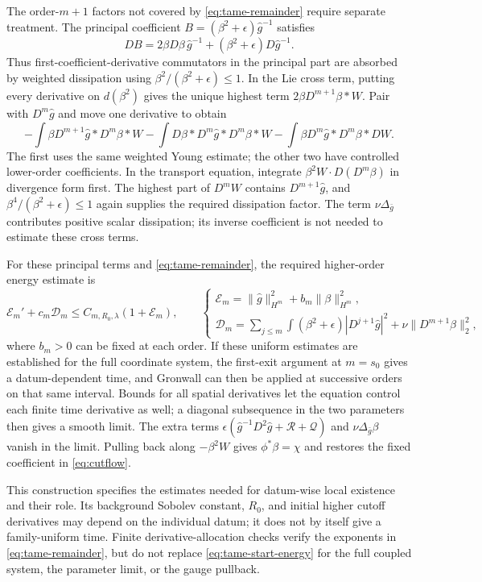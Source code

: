 \documentclass[a4paper,11pt]{article}
\numberwithin{equation}{section}
\theoremstyle{definition}
\begin{document}
The order-$m+1$ factors not covered by \eqref{eq:tame-remainder} require separate treatment.
The principal coefficient $B=(\beta^2+\epsilon)\widehat g^{-1}$ satisfies
\[
DB=2\beta D\beta\,\widehat g^{-1}
+(\beta^2+\epsilon)D\widehat g^{-1}.
\]
Thus first-coefficient-derivative commutators in the principal part are absorbed by weighted dissipation using
$\beta^2/(\beta^2+\epsilon)\le1$.
In the Lie cross term, putting every derivative on $d(\beta^2)$ gives the unique highest term
$2\beta D^{m+1}\beta*W$. Pair with $D^m\widehat g$ and move one derivative to obtain
\[
-\int\beta D^{m+1}\widehat g*D^m\beta*W
-\int D\beta*D^m\widehat g*D^m\beta*W
-\int\beta D^m\widehat g*D^m\beta*DW.
\]
The first uses the same weighted Young estimate; the other two have controlled lower-order coefficients.
In the transport equation, integrate $\beta^2W\cdot D(D^m\beta)$ in divergence form first.
The highest part of $D^mW$ contains $D^{m+1}\widehat g$, and
$\beta^4/(\beta^2+\epsilon)\le1$ again supplies the required dissipation factor.
The term $\nu\Delta_{\bar g}$ contributes positive scalar dissipation; its inverse coefficient is not needed to estimate these cross terms.

For these principal terms and \eqref{eq:tame-remainder}, the required higher-order energy estimate is
\begin{equation}\label{eq:tame-start-energy}
\mathscr E_m'+c_m\mathscr D_m
\le C_{m,R_0,\lambda}(1+\mathscr E_m),\qquad
\begin{cases}
\mathscr E_m=\|\widehat g\|_{H^m}^2+b_m\|\beta\|_{H^m}^2,\\
\mathscr D_m=\sum_{j\le m}\int(\beta^2+\epsilon)|D^{j+1}\widehat g|^2
+\nu\|D^{m+1}\beta\|_2^2,
\end{cases}
\end{equation}
where $b_m>0$ can be fixed at each order. If these uniform estimates are established for the full coordinate system,
the first-exit argument at $m=s_0$ gives a datum-dependent time, and Gronwall can then be applied at successive orders on that same interval.
Bounds for all spatial derivatives let the equation control each finite time derivative as well;
a diagonal subsequence in the two parameters then gives a smooth limit.
The extra terms $\epsilon(\widehat g^{-1}D^2\widehat g+\mathscr R+\mathscr Q)$
and $\nu\Delta_{\bar g}\beta$ vanish in the limit.
Pulling back along $-\beta^2W$ gives $\phi^*\beta=\chi$ and restores the fixed coefficient in \eqref{eq:cutflow}.

This construction specifies the estimates needed for datum-wise local existence and their role.
Its background Sobolev constant, $R_0$, and initial higher cutoff derivatives may depend on the individual datum;
it does not by itself give a family-uniform time. Finite derivative-allocation checks verify the exponents in
\eqref{eq:tame-remainder}, but do not replace \eqref{eq:tame-start-energy} for the full coupled system,
the parameter limit, or the gauge pullback.
\end{document}
